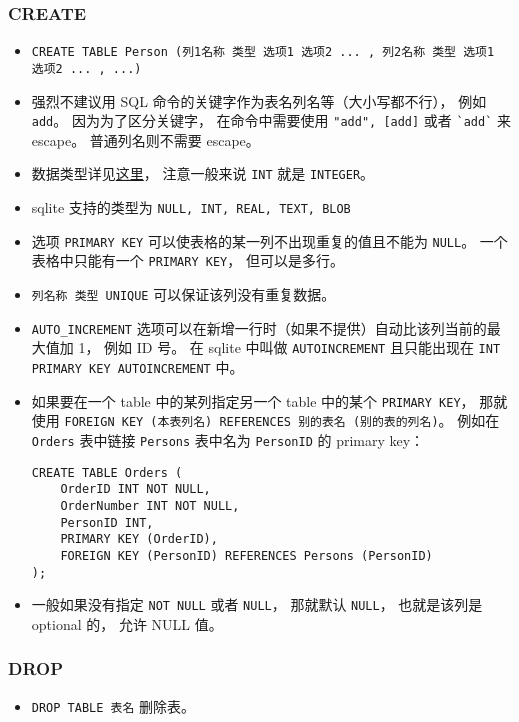 \subsubsection{CREATE}
\begin{itemize}
\item \verb|CREATE TABLE Person (列1名称 类型 选项1 选项2 ... , 列2名称 类型 选项1 选项2 ... , ...)|
\item 强烈不建议用 SQL 命令的关键字作为表名列名等（大小写都不行）， 例如 \verb|add|。 因为为了区分关键字， 在命令中需要使用 \verb|"add", [add]| 或者 \verb|`add`| 来 escape。 普通列名则不需要 escape。
\item 数据类型详见\href{https://www.w3schools.com/sql/sql_datatypes.asp}{这里}， 注意一般来说 \verb|INT| 就是 \verb|INTEGER|。
\item sqlite 支持的类型为 \verb|NULL, INT, REAL, TEXT, BLOB|
\item 选项 \verb|PRIMARY KEY| 可以使表格的某一列不出现重复的值且不能为 \verb|NULL|。 一个表格中只能有一个 \verb|PRIMARY KEY|， 但可以是多行。
\item \verb|列名称 类型 UNIQUE| 可以保证该列没有重复数据。
\item \verb|AUTO_INCREMENT| 选项可以在新增一行时（如果不提供）自动比该列当前的最大值加 1， 例如 ID 号。 在 sqlite 中叫做 \verb|AUTOINCREMENT| 且只能出现在 \verb|INT PRIMARY KEY AUTOINCREMENT| 中。
\item 如果要在一个 table 中的某列指定另一个 table 中的某个 \verb|PRIMARY KEY|， 那就使用 \verb|FOREIGN KEY (本表列名) REFERENCES 别的表名 (别的表的列名)|。 例如在 \verb|Orders| 表中链接 \verb|Persons| 表中名为 \verb|PersonID| 的 primary key：
\begin{lstlisting}[language=none]
CREATE TABLE Orders (
    OrderID INT NOT NULL,
    OrderNumber INT NOT NULL,
    PersonID INT,
    PRIMARY KEY (OrderID),
    FOREIGN KEY (PersonID) REFERENCES Persons (PersonID)
);
\end{lstlisting}
\item 一般如果没有指定 \verb|NOT NULL| 或者 \verb|NULL|， 那就默认 \verb|NULL|， 也就是该列是 optional 的， 允许 NULL 值。
\end{itemize}

\subsubsection{DROP}
\begin{itemize}
\item \verb|DROP TABLE 表名| 删除表。
\end{itemize}


